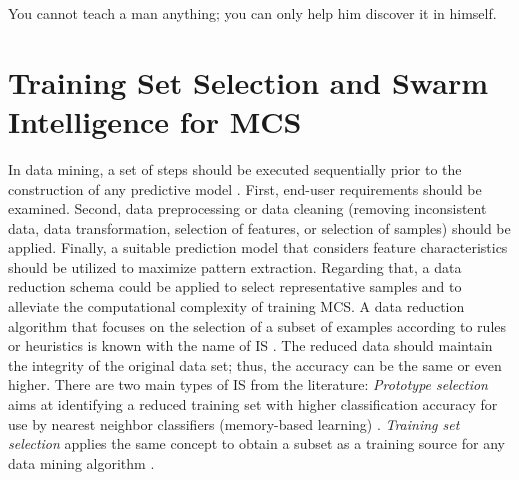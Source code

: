 



\begin{savequote}[50mm]
You cannot teach a man anything; you can only help him discover it in himself.
\end{savequote}


\chapter{Training Set Selection and Swarm Intelligence for MCS}
\label{chapter4_training-set}


In data mining, a set of steps should be executed sequentially prior to the construction of any predictive model \cite{garcia2015}. First, end-user requirements should be examined. Second, data preprocessing or data cleaning (removing inconsistent data, data transformation, selection of features, or selection of samples) should be applied. Finally, a suitable prediction model that considers feature characteristics should be utilized to maximize pattern extraction. Regarding that, a data reduction schema could be applied to select representative samples and to alleviate the computational complexity of training MCS. A data reduction algorithm that focuses on the selection of a subset of examples according to rules or heuristics is known with the name of IS \cite{garcia2015}. The reduced data should maintain the integrity of the original data set; thus, the accuracy can be the same or even higher. There are two main types of IS from the literature: \textit{Prototype selection} aims at identifying a reduced training set with higher classification accuracy for use by nearest neighbor classifiers (memory-based learning) \cite{garcia2011}. \textit{Training set selection} applies the same concept to obtain a subset as a training source for any data mining algorithm \cite{cano2007}.

